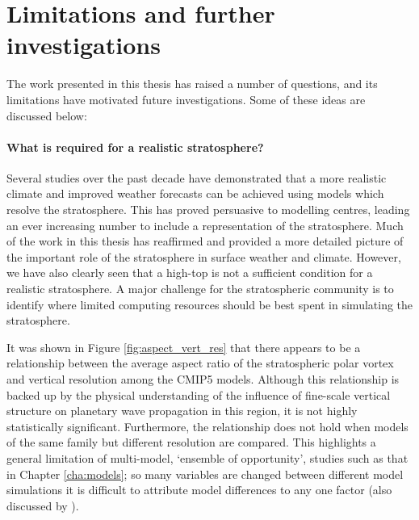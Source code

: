 
\section{Limitations and further investigations}

The work presented in this thesis has raised a number of questions, and its
limitations have motivated future investigations. Some of these ideas are
discussed below:

\paragraph{What is required for a realistic stratosphere?} Several studies over
the past decade have demonstrated that a more realistic climate and improved
weather forecasts can be achieved using models which resolve the
stratosphere. This has proved persuasive to modelling centres, leading an ever
increasing number to include a representation of the stratosphere. Much of the
work in this thesis has reaffirmed and provided a more detailed picture of the
important role of the stratosphere in surface weather and climate. However, we
have also clearly seen that a high-top is not a sufficient condition for a
realistic stratosphere. A major challenge for the stratospheric community is to
identify where limited computing resources should be best spent in simulating
the stratosphere.

It was shown in Figure \ref{fig:aspect_vert_res} that there appears to be a
relationship between the average aspect ratio of the stratospheric polar vortex
and vertical resolution among the CMIP5 models. Although this relationship is
backed up by the physical understanding of the influence of fine-scale vertical
structure on planetary wave propagation in this region, it is not highly
statistically significant. Furthermore, the relationship does not hold when
models of the same family but different resolution are compared. This highlights
a general limitation of multi-model, `ensemble of opportunity', studies such as
that in Chapter \ref{cha:models}; so many variables are changed between
different model simulations it is difficult to attribute model differences to
any one factor (also discussed by \citet{Tebaldi2007}).

